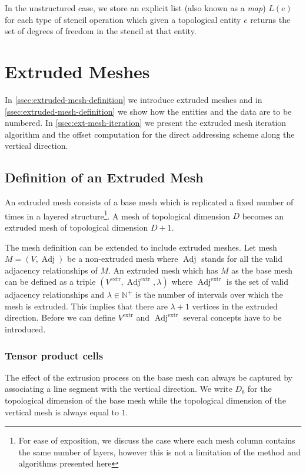\documentclass[11pt, a4paper]{scrartcl}
\DeclareMathOperator{\Adj}{Adj}
\begin{document}
In the unstructured case, we store an explicit list (also known as a
\textit{map}) $L(e)$ for each type of stencil operation which given a
topological entity $e$ returns the set of degrees of freedom in the
stencil at that entity.

\section{Extruded Meshes}
\label{sec:extruded-meshes}

In \autoref{ssec:extruded-mesh-definition} we introduce extruded
meshes and in \autoref{ssec:extruded-mesh-definition} we show how the
entities and the data are to be numbered. In
\autoref{ssec:ext-mesh-iteration} we present the extruded mesh
iteration algorithm and the offset computation for the direct
addressing scheme along the vertical direction.

\subsection{Definition of an Extruded Mesh}
\label{ssec:extruded-mesh-definition}

An extruded mesh consists of a base mesh which is replicated a fixed
number of times in a layered structure\footnote{For ease of
  exposition, we discuss the case where each mesh column contains the
  same number of layers, however this is not a limitation of the
  method and algorithms presented here}. A mesh of topological
dimension $D$ becomes an extruded mesh of topological dimension $D+1$.

The mesh definition can be extended to include extruded meshes. Let
mesh $M = (V, \Adj)$ be a non-extruded mesh where $\Adj$ stands for
all the valid adjacency relationships of $M$. An extruded mesh which
has $M$ as the base mesh can be defined as a triple
$(V^\textrm{extr}, \Adj^\textrm{extr}, \lambda)$ where
$\Adj^\textrm{extr}$ is the set of valid adjacency relationships and
$\lambda \in \mathbb{N}^+$ is the number of intervals over which the
mesh is extruded.  This implies that there are $\lambda+1$ vertices in
the extruded direction.  Before we can define $V^\textrm{extr}$ and
$\Adj^\textrm{extr}$ several concepts have to be introduced.

\subsubsection{Tensor product cells}
\label{sssec:tensor-product-cells}
The effect of the extrusion process on the base mesh can always be
captured by associating a line segment with the vertical direction. We
write $D_{b}$ for the topological dimension of the base mesh while the
topological dimension of the vertical mesh is always equal to $1$.
\end{document}
